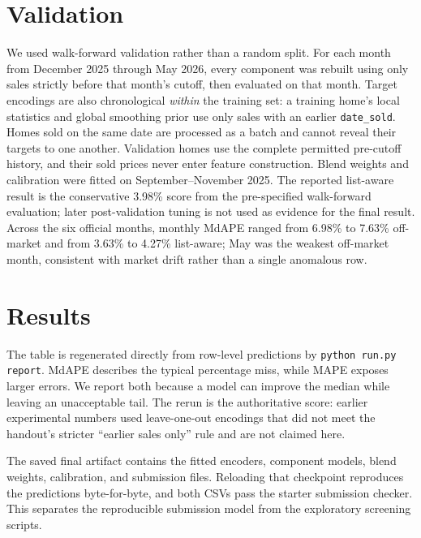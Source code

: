 \documentclass[11pt]{article}
\begin{document}
\section{Validation}
We used walk-forward validation rather than a random split.  For each month from
December 2025 through May 2026, every component was rebuilt using only sales
strictly before that month's cutoff, then evaluated on that month.  Target
encodings are also chronological \emph{within} the training set: a training
home's local statistics and global smoothing prior use only sales with an
earlier \texttt{date\_sold}.  Homes sold on the same date are processed as a
batch and cannot reveal their targets to one another.  Validation homes use the
complete permitted pre-cutoff history, and their sold prices never enter feature
construction.  Blend weights and calibration were fitted on
September--November 2025.  The reported list-aware result is the conservative
3.98\% score from the pre-specified walk-forward evaluation; later
post-validation tuning is not used as evidence for the final result.
Across the six official months, monthly MdAPE ranged from 6.98\% to 7.63\%
off-market and from 3.63\% to 4.27\% list-aware; May was the weakest
off-market month, consistent with market drift rather than a single anomalous
row.

\section{Results}
\begin{table}[h]
\centering

\caption{Walk-forward validation on the listings. MdAPE: median absolute percentage error.
MAPE: mean absolute percentage error. Brackets: bootstrap 95\% interval.}
\end{table}
The table is regenerated directly from row-level predictions by
\texttt{python run.py report}.  MdAPE describes the typical percentage miss,
while MAPE exposes larger errors.  We report both because a model can improve
the median while leaving an unacceptable tail.  The rerun is the authoritative
score: earlier experimental numbers used leave-one-out encodings that did not
meet the handout's stricter ``earlier sales only'' rule and are not claimed here.

The saved final artifact contains the fitted encoders, component models, blend
weights, calibration, and submission files.  Reloading that checkpoint
reproduces the predictions byte-for-byte, and both CSVs pass the starter
submission checker.  This separates the reproducible submission model from
the exploratory screening scripts.
\end{document}
